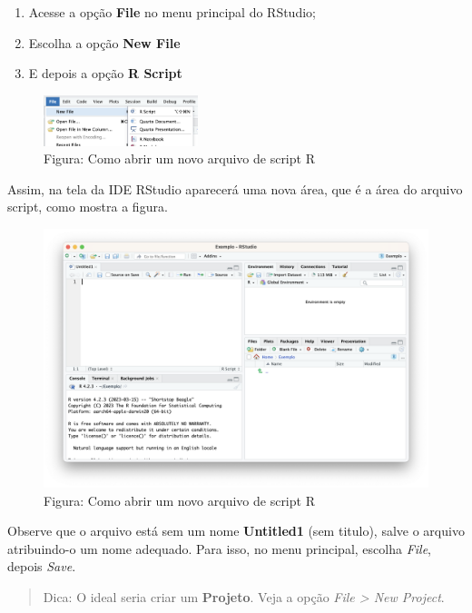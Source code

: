 \documentclass[
]{book}
\begin{document}
\begin{enumerate}
\def\labelenumi{\arabic{enumi}.}
\item
  Acesse a opção \textbf{File} no menu principal do RStudio;
\item
  Escolha a opção \textbf{New File}
\item
  E depois a opção \textbf{R Script}
\end{enumerate}

\begin{figure}
\centering
\includegraphics[width=0.4\textwidth,height=\textheight]{arquivoScript.png}
\caption{Figura: Como abrir um novo arquivo de script R}
\end{figure}

Assim, na tela da IDE RStudio aparecerá uma nova área, que é a área do arquivo script, como mostra a figura.

\begin{figure}
\centering
\includegraphics{telaScript.png}
\caption{Figura: Como abrir um novo arquivo de script R}
\end{figure}

Observe que o arquivo está sem um nome \textbf{Untitled1} (sem titulo), salve o arquivo atribuindo-o um nome adequado. Para isso, no menu principal, escolha \emph{File}, depois \emph{Save}.

\begin{quote}
Dica: O ideal seria criar um \textbf{Projeto}. Veja a opção \emph{File \textgreater{} New Project}.
\end{quote}
\end{document}
